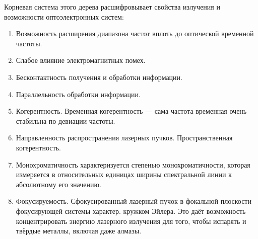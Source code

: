 \documentclass[12pt, russian, oneside, article]{ncc}
\begin{document}
Корневая система этого дерева расшифровывает свойства излучения и возможности оптоэлектронных систем:
\begin{enumerate}
\item Возможность расширения диапазона частот вплоть до оптической временной частоты.
\item Слабое влияние электромагнитных помех.
\item Бесконтактность получения и обработки информации.
\item Параллельность обработки информации.
\item Когерентность. Временная когерентность --- сама частота временная очень стабильна по девиации частоты.
\item Направленность распространения лазерных пучков. Пространственная когерентность.
\item Монохроматичность характеризуется степенью монохроматичности, которая измеряется в относительных единицах ширины спектральной линии к абсолютному его значению.
\item Фокусируемость. Сфокусированный лазерный пучок в фокальной плоскости фокусирующей системы характер. кружком Эйлера. Это даёт возможность концентрировать энергию лазерного излучения для того, чтобы испарять и твёрдые металлы, включая даже алмазы.
\end{enumerate}
\end{document}
